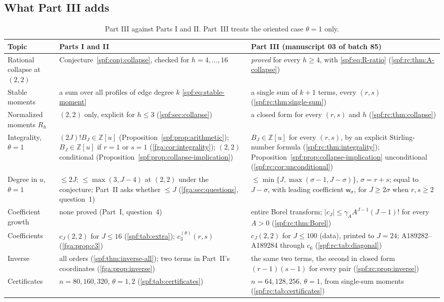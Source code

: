 \documentclass[11pt]{article}
\numberwithin{equation}{section}
\theoremstyle{definition}
\theoremstyle{remark}
\theoremstyle{definition}
\newcommand{\Z}{\mathbb Z}
\newcommand{\rcw}{\mathsf w}
\begin{document}
\subsection{What Part III adds}
\label{spf:rc:sec:claims}

\begin{table}[htbp]
\centering\small
\renewcommand{\arraystretch}{1.15}
\begin{tabular}{@{}>{\raggedright\arraybackslash}p{}>{\raggedright\arraybackslash}p{}>{\raggedright\arraybackslash}p{}@{}}
\toprule
Topic & Parts I and II & Part III (manuscript 03 of batch 85)\\
\midrule
Rational collapse at $(2,2)$ &
Conjecture~\ref{spf:conj:collapse}, checked for $h=4,\ldots,16$ &
\emph{proved} for every $h\ge4$, with \eqref{spf:eq:R-ratio}
(\cref{spf:rc:thm:A-collapse})\\
Stable moments &
a sum over all profiles of edge degree $k$ \eqref{spf:eq:stable-moment} &
a single sum of $k+1$ terms, every $(r,s)$ (\cref{spf:rc:thm:single-sum})\\
Normalized moments $R_h$ &
$(2,2)$ only, explicit for $h\le3$ (\cref{spf:sec:collapse}) &
a closed form for every $(r,s)$ and $h$ (\cref{spf:rc:thm:collapse})\\
Integrality, $\theta=1$ &
$(2J)!B_J\in\Z[u]$ (Proposition~\ref{spf:prop:arithmetic}); $B_J\in\Z[u]$ if
$r=1$ or $s=1$ (\cref{fga:cor:integrality}); $(2,2)$ conditional
(Proposition~\ref{spf:prop:collapse-implication}) &
$B_J\in\Z[u]$ for every $(r,s)$, by an explicit Stirling-number formula
(\cref{spf:rc:thm:integrality}); Proposition~\ref{spf:prop:collapse-implication}
unconditional (\cref{spf:rc:cor:unconditional})\\
Degree in $u$, $\theta=1$ &
$\le2J$; $\le\max(3,J-4)$ at $(2,2)$ under the conjecture; Part~II asks
whether $\le J$ (\cref{fga:sec:questions}, question~1) &
$\le\min\{J,\max(\sigma-1,J-\sigma)\}$, $\sigma=r+s$; equal to $J-\sigma$,
with leading coefficient $\rcw_\sigma$, for $J\ge2\sigma$ when $r,s\ge2$\\
Coefficient growth &
none proved (Part~I, question~4) &
entire Borel transform; $|c_J|\le\gamma_AA^{J-1}(J-1)!$ for every $A>0$
(\cref{spf:rc:thm:Borel})\\
Coefficients &
$c_J(2,2)$ for $J\le16$ (\cref{spf:tab:extra}); $c_3^{(\theta)}(r,s)$
(\cref{fga:prop:c3}) &
$c_J(2,2)$ for $J\le100$ (data), printed to $J=24$; A189282--A189284 through
$c_6$ (\cref{spf:rc:tab:diagonal})\\
Inverse &
all orders (\cref{spf:thm:inverse-all}); two terms in Part~II's coordinates
(\cref{fga:prop:inverse}) &
the same two terms, the second in closed form $(r-1)(s-1)$ for every pair
(\cref{spf:rc:prop:inverse})\\
Certificates &
$n=80,160,320$, $\theta=1,2$ (\cref{spf:tab:certificates}) &
$n=64,128,256$, $\theta=1$, from single-sum moments
(\cref{spf:rc:tab:certificates})\\
\bottomrule
\end{tabular}
\caption{Part III against Parts I and II. Part~III treats the oriented case
$\theta=1$ only.}
\label{spf:rc:tab:claims}
\end{table}
\end{document}
